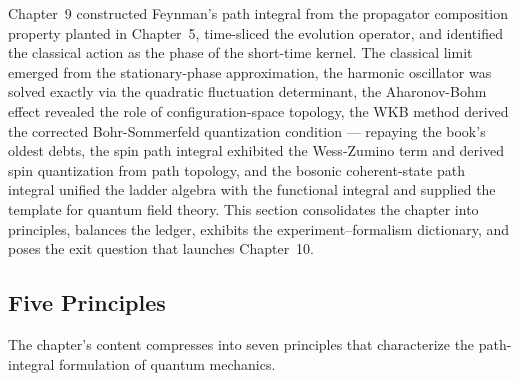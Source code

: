 Chapter~9 constructed Feynman's path integral from the propagator composition property planted in Chapter~5, time-sliced the evolution operator, and identified the classical action as the phase of the short-time kernel. The classical limit emerged from the stationary-phase approximation, the harmonic oscillator was solved exactly via the quadratic fluctuation determinant, the Aharonov-Bohm effect revealed the role of configuration-space topology, the WKB method derived the corrected Bohr-Sommerfeld quantization condition --- repaying the book's oldest debts, the spin path integral exhibited the Wess-Zumino term and derived spin quantization from path topology, and the bosonic coherent-state path integral unified the ladder algebra with the functional integral and supplied the template for quantum field theory. This section consolidates the chapter into principles, balances the ledger, exhibits the experiment--formalism dictionary, and poses the exit question that launches Chapter~10.

\subsection{Five Principles}

The chapter's content compresses into seven principles that characterize the path-integral formulation of quantum mechanics.

